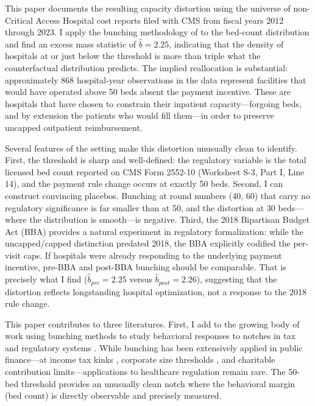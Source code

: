 \documentclass[12pt]{article}
\begin{document}
This paper documents the resulting capacity distortion using the universe of non-Critical Access Hospital cost reports filed with CMS from fiscal years 2012 through 2023. I apply the bunching methodology of \citet{kleven2016bunching} to the bed-count distribution and find an excess mass statistic of $\hat{b} = 2.25$, indicating that the density of hospitals at or just below the threshold is more than triple what the counterfactual distribution predicts. The implied reallocation is substantial: approximately 868 hospital-year observations in the data represent facilities that would have operated above 50 beds absent the payment incentive. These are hospitals that have chosen to constrain their inpatient capacity---forgoing beds, and by extension the patients who would fill them---in order to preserve uncapped outpatient reimbursement.

Several features of the setting make this distortion unusually clean to identify. First, the threshold is sharp and well-defined: the regulatory variable is the total licensed bed count reported on CMS Form 2552-10 (Worksheet S-3, Part I, Line 14), and the payment rule change occurs at exactly 50 beds. Second, I can construct convincing placebos. Bunching at round numbers (40, 60) that carry no regulatory significance is far smaller than at 50, and the distortion at 30 beds---where the distribution is smooth---is negative. Third, the 2018 Bipartisan Budget Act (BBA) provides a natural experiment in regulatory formalization: while the uncapped/capped distinction predated 2018, the BBA explicitly codified the per-visit caps. If hospitals were already responding to the underlying payment incentive, pre-BBA and post-BBA bunching should be comparable. That is precisely what I find ($\hat{b}_{pre} = 2.25$ versus $\hat{b}_{post} = 2.26$), suggesting that the distortion reflects longstanding hospital optimization, not a response to the 2018 rule change.

This paper contributes to three literatures. First, I add to the growing body of work using bunching methods to study behavioral responses to notches in tax and regulatory systems \citep{kleven2013using, saez2010earnings}. While bunching has been extensively applied in public finance---at income tax kinks \citep{chetty2011adjustment}, corporate size thresholds \citep{garicano2016firm}, and charitable contribution limits---applications to healthcare regulation remain rare. The 50-bed threshold provides an unusually clean notch where the behavioral margin (bed count) is directly observable and precisely measured.
\end{document}
